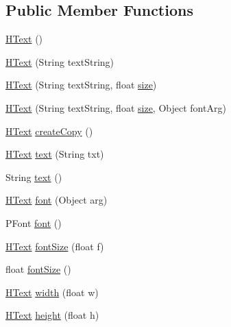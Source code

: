\subsection*{Public Member Functions}
\begin{DoxyCompactItemize}
\item 
\hyperlink{classhype_1_1drawable_1_1_h_text_abd1a70b565e3317a23fafdb0d7d893c1}{H\-Text} ()
\item 
\hyperlink{classhype_1_1drawable_1_1_h_text_ac9b84354f82c63669dd676eb988b6425}{H\-Text} (String text\-String)
\item 
\hyperlink{classhype_1_1drawable_1_1_h_text_a670828657fd6d3443dc99d404b6436a3}{H\-Text} (String text\-String, float \hyperlink{classhype_1_1drawable_1_1_h_text_a1a47daa77145971b6ef72a0fc90a7911}{size})
\item 
\hyperlink{classhype_1_1drawable_1_1_h_text_af39e7ea27726741693fd6c957ccd02cf}{H\-Text} (String text\-String, float \hyperlink{classhype_1_1drawable_1_1_h_text_a1a47daa77145971b6ef72a0fc90a7911}{size}, Object font\-Arg)
\item 
\hyperlink{classhype_1_1drawable_1_1_h_text}{H\-Text} \hyperlink{classhype_1_1drawable_1_1_h_text_ae908bda8c33aa5a70e82e4ae1b8f3187}{create\-Copy} ()
\item 
\hyperlink{classhype_1_1drawable_1_1_h_text}{H\-Text} \hyperlink{classhype_1_1drawable_1_1_h_text_a647993e931bb74cdf36ff2eb7d3ed30f}{text} (String txt)
\item 
String \hyperlink{classhype_1_1drawable_1_1_h_text_ae5d3e5e1a7d0cc2578327408936dd740}{text} ()
\item 
\hyperlink{classhype_1_1drawable_1_1_h_text}{H\-Text} \hyperlink{classhype_1_1drawable_1_1_h_text_a539acc29624f344e82c7a43e342ec927}{font} (Object arg)
\item 
P\-Font \hyperlink{classhype_1_1drawable_1_1_h_text_a273e812e78225a53012e00595543591d}{font} ()
\item 
\hyperlink{classhype_1_1drawable_1_1_h_text}{H\-Text} \hyperlink{classhype_1_1drawable_1_1_h_text_a8972dfdc3677f1477da78d43a65c8bc9}{font\-Size} (float f)
\item 
float \hyperlink{classhype_1_1drawable_1_1_h_text_aa0c33b11fb4c2adb4ff564fd8647df16}{font\-Size} ()
\item 
\hyperlink{classhype_1_1drawable_1_1_h_text}{H\-Text} \hyperlink{classhype_1_1drawable_1_1_h_text_a34d2ed02a16e5cfde7a1234c81752405}{width} (float w)
\item 
\hyperlink{classhype_1_1drawable_1_1_h_text}{H\-Text} \hyperlink{classhype_1_1drawable_1_1_h_text_aa5de72954d2566d756b8f215fec23a1b}{height} (float h)

\end{DoxyCompactItemize}
